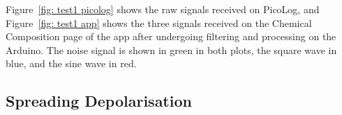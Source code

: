 Figure~\ref{fig: test1 picolog} shows the raw signals received on PicoLog, and Figure~\ref{fig: test1 app} shows the three signals received on the Chemical Composition page of the app after undergoing filtering and processing on the Arduino. The noise signal is shown in green in both plots, the square wave in blue, and the sine wave in red.


\subsection{Spreading Depolarisation}